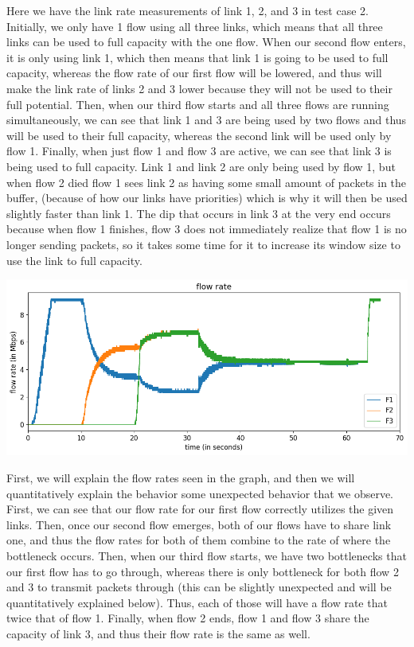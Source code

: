 \documentclass{article}
\begin{document}
Here we have the link rate measurements of link 1, 2, and 3 in test case 2. Initially, we only have 1 flow using all three links, which means that all three links can be used to full capacity with the one flow. When our second flow enters, it is only using link 1, which then means that link 1 is going to be used to full capacity, whereas the flow rate of our first flow will be lowered, and thus will make the link rate of links 2 and 3 lower because they will not be used to their full potential. Then, when our third flow starts and all three flows are running simultaneously, we can see that link 1 and 3 are being used by two flows and thus will be used to their full capacity, whereas the second link will be used only by flow 1. Finally, when just flow 1 and flow 3 are active, we can see that link 3 is being used to full capacity. Link 1 and link 2 are only being used by flow 1, but when flow 2 died flow 1 sees link 2 as having some small amount of packets in the buffer, (because of how our links have priorities) which is why it will then be used slightly faster than link 1. The dip that occurs in link 3 at the very end occurs because when flow 1 finishes, flow 3 does not immediately realize that flow 1 is no longer sending packets, so it takes some time for it to increase its window size to use the link to full capacity.

\includegraphics[width = \textwidth]{"test_case2_fast flow rate"}

First, we will explain the flow rates seen in the graph, and then we will quantitatively explain the behavior some unexpected behavior that we observe. First, we can see that our flow rate for our first flow correctly utilizes the given links. Then, once our second flow emerges, both of our flows have to share link one, and thus the flow rates for both of them combine to the rate of where the bottleneck occurs. Then, when our third flow starts, we have two bottlenecks that our first flow has to go through, whereas there is only bottleneck for both flow 2 and 3 to transmit packets through (this can be slightly unexpected and will be quantitatively explained below). Thus, each of those will have a flow rate that twice that of flow 1. Finally, when flow 2 ends, flow 1 and flow 3 share the capacity of link 3, and thus their flow rate is the same as well. 
\end{document}
